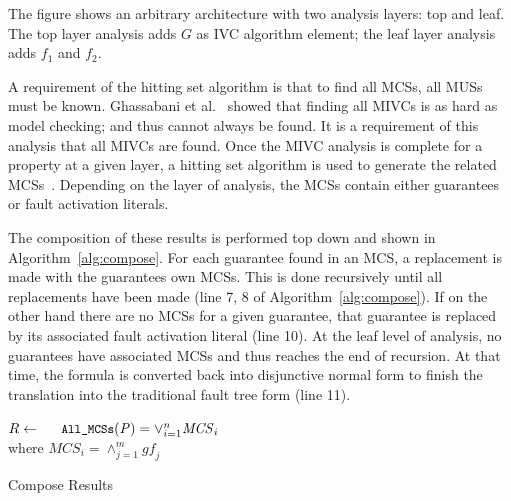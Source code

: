The figure shows an arbitrary architecture with two analysis layers: top and leaf. The top layer analysis adds $G$ as IVC algorithm element; the leaf layer analysis adds $f_1$ and $f_2$. 

A requirement of the hitting set algorithm is that to find all MCSs, all MUSs must be known. Ghassabani et al.~\cite{Ghassabani2017EfficientGO} showed that finding all MIVCs is as hard as model checking; and thus cannot always be found. It is a requirement of this analysis that all MIVCs are found. Once the MIVC analysis is complete for a property at a given layer, a hitting set algorithm is used to generate the related MCSs~\cite{gainer2017minimal}. Depending on the layer of analysis, the MCSs contain either guarantees or fault activation literals.


The composition of these results is performed top down and shown in Algorithm~\ref{alg:compose}. For each guarantee found in an MCS, a replacement is made with the guarantees own MCSs. This is done recursively until all replacements have been made (line 7, 8 of Algorithm~\ref{alg:compose}). If on the other hand there are no MCSs for a given guarantee, that guarantee is replaced by its associated fault activation literal (line 10). At the leaf level of analysis, no guarantees have associated MCSs and thus reaches the end of recursion. At that time, the formula is converted back into disjunctive normal form to finish the translation into the traditional fault tree form (line 11). 

\begin{algorithm}[h]

	$R \gets \mathit{\amcs(P)} = \lor_{i=1}^n \mathit{MCS}_i$\\
	where $\mathit{MCS}_i = \land_{j=1}^m \mathit{gf_j}$\\
	\caption{Compose Results}
	\label{alg:compose}
\end{algorithm}

